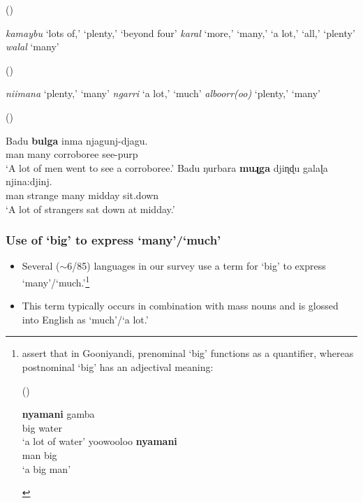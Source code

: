 \documentclass{article}
\makeatletter
\newcommand{\ofy}{/85} %
\makeatother
\begin{document}
\begin{exe}
 (\citealt{sharpe98})
\begin{xlist}
\ex \textit{kamaybu} `lots of,' `plenty,' `beyond four'
\ex \textit{karal} `more,' `many,' `a lot,' `all,' `plenty'
\ex \textit{walal}  `many' 
\end{xlist} 
 (\citealt{bowern12}) 
\begin{xlist}
\ex \textit{niimana}  `plenty,' `many'
\ex \textit{ngarri} `a lot,' `much'
\ex \textit{alboorr(oo)} `plenty,' `many'
\end{xlist} 
 (\citealt[32, 57]{platt72})
\begin{xlist}
\ex  \gll Badu \textbf{bulga} inma         njagunj-djagu.\\
man many corroboree see-{\sc purp}\\
\glt `A lot of men went to see a corroboree.' %
\ex  \gll Badu ŋurbara \textbf{muɻga} djiɳɖu galaɭa njina:djinj.\\
man  strange  many  midday  sit.down\\
\glt `A lot of strangers sat down at midday.' 
\end{xlist}
\end{exe}

\subsubsection{Use of `big' to express `many'/`much' \label{bigmanysection}}

\begin{itemize}
    \item Several ($\sim$6\ofy) languages in our survey use a term for `big' to express `many'/`much.'\footnote{\citet[37]{louagieverstraete16} assert that in Gooniyandi, prenominal `big' functions as a quantifier, whereas postnominal `big' has an adjectival meaning:
    \vspace{-2mm}
    \begin{exe}
     (\citealt[260,265]{mcgregor90})
    \begin{xlist}
    \ex \gll \textbf{nyamani} gamba\\
big water \\
\glt `a lot of water'%
\ex \gll yoowooloo \textbf{nyamani} \\
man big \\
\glt `a big man' %
    \end{xlist}
    \end{exe}
    }
    \item This term typically occurs in combination with mass nouns and is glossed into English as `much'/`a lot.'
\end{itemize}
\end{document}

